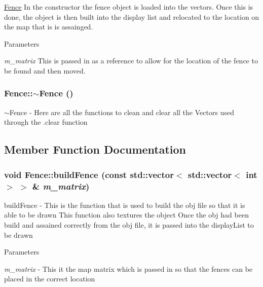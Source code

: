 \hyperlink{classFence}{Fence} In the constructor the fence object is loaded into the vectors. Once this is done, the object is then built into the display list and relocated to the location on the map that is is assainged. 
\begin{DoxyParams}{Parameters}
\item[{\em m\_\-matrix}]This is passed in as a reference to allow for the location of the fence to be found and then moved. \end{DoxyParams}
\hypertarget{classFence_a542d1f0e5b80afc0b19865071cd6c616}{
\subsubsection[{$\sim$Fence}]{\setlength{\rightskip}{0pt plus 5cm}Fence::$\sim$Fence ()}}
\label{classFence_a542d1f0e5b80afc0b19865071cd6c616}


$\sim$Fence -\/ Here are all the functions to clean and clear all the Vectors used through the .clear function 

\subsection{Member Function Documentation}
\hypertarget{classFence_a6d6131c45143ce2d601ce92e2d621460}{
\subsubsection[{buildFence}]{\setlength{\rightskip}{0pt plus 5cm}void Fence::buildFence (const std::vector$<$ std::vector$<$ int $>$ $>$ \& {\em m\_\-matrix})}}
\label{classFence_a6d6131c45143ce2d601ce92e2d621460}


buildFence -\/ This is the function that is used to build the obj file so that it is able to be drawn This function also textures the object Once the obj had been build and assained correctly from the obj file, it is passed into the displayList to be drawn 
\begin{DoxyParams}{Parameters}
\item[{\em m\_\-matrix}]-\/ This it the map matrix which is passed in so that the fences can be placed in the correct location \end{DoxyParams}


